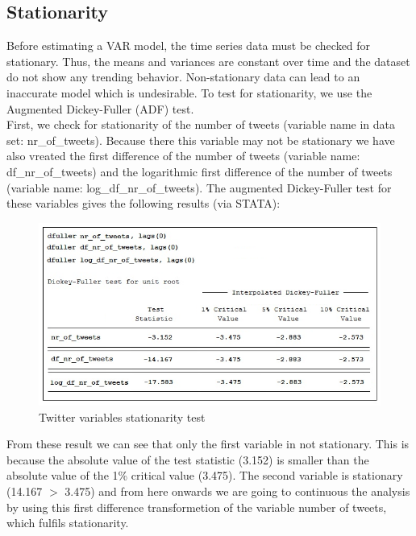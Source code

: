 \documentclass[a4paper,american,12pt]{article}
\begin{document}
\begin{spacing}{1.2}
\subsection{Stationarity}
Before estimating a VAR model, the time series data must be checked for stationary. Thus, the means and variances are constant over time and the dataset do not show any trending behavior. Non-stationary data can lead to an inaccurate model which is undesirable. To test for stationarity, we use the Augmented Dickey-Fuller (ADF) test.\\
First, we check for stationarity of the number of tweets (variable name in data set: nr\_of\_tweets). Because there this variable may not be stationary we have also vreated the first difference of the number of tweets (variable name: df\_nr\_of\_tweets) and the logarithmic first difference of the number of tweets (variable name: log\_df\_nr\_of\_tweets). The augmented Dickey-Fuller test for these variables gives the following results (via STATA):\\

\begin{figure}[H]
\centering
\includegraphics[scale=0.85]{stata_export_graphs/ADF_twitter_variables.png}
\caption{Twitter variables stationarity test}
\label{fig:3}
\end{figure}
	
From these result we can see that only the first variable in not stationary. This is because the absolute value of the test statistic (3.152) is smaller than the absolute value of the 1\% critical value (3.475). The second variable is stationary (14.167 $>$ 3.475) and from here onwards we are going to continuous the analysis by using this first difference transformetion of the variable number of tweets, which fulfils stationarity.\\


\end{spacing}
\end{document}
